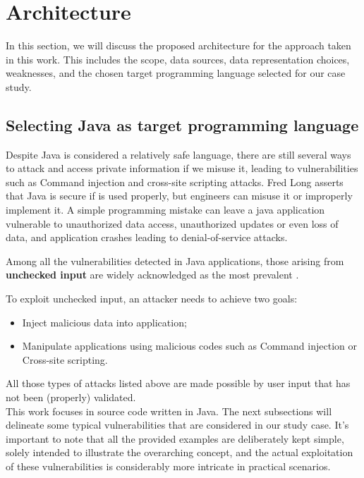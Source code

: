 % 
%  
%

\chapter{Architecture}
\label{cha:architecture_chapter}

In this section, we will discuss the proposed architecture for the approach taken in this work. This includes the scope, data sources, data representation choices, weaknesses, and the chosen target programming language selected for our case study.

\section{Selecting Java as target programming language} %
\label{sec: target_programming_language}


Despite Java is considered a relatively safe language, there are still several ways to attack and access private information if we misuse it, leading to vulnerabilities such as Command injection and cross-site scripting attacks. Fred Long \cite{10.5555/2536828} asserts that Java is secure if is used properly, but engineers can misuse it or improperly implement it. A simple programming mistake can leave a java application vulnerable to unauthorized data access, unauthorized updates or even loss of data, and application crashes leading to denial-of-service attacks.

Among all the vulnerabilities detected in Java applications, those arising from \textbf{unchecked input} are widely acknowledged as the most prevalent \cite{OWASP_TOP_TEN_2004}.

To exploit unchecked input, an attacker needs to achieve two goals: 

\begin{itemize}
\item  Inject malicious data into application;
\item  Manipulate applications using malicious codes such as Command injection or Cross-site scripting.
\end{itemize}

All those types of attacks listed above are made possible by user input that has not been
(properly) validated.\\

This work focuses in source code written in Java. The next subsections will delineate some typical vulnerabilities that are considered in our study case.  It's important to note that all the provided examples are deliberately kept simple, solely intended to illustrate the overarching concept, and the actual exploitation of these vulnerabilities is considerably more intricate in practical scenarios.


